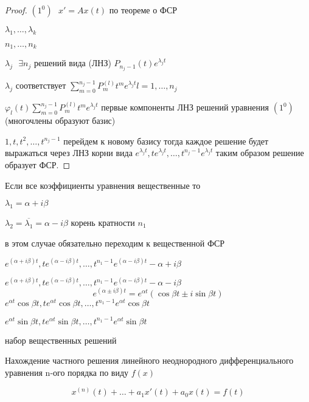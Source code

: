 \begin{proof}
  $(1^0) ~~~ x' = Ax(t)$ по теореме о ФСР

  $\lambda_1, \ldots, \lambda_k$

  $n_1, \ldots, n_k$

  $\lambda_j ~~~ \exists n_j$ решений вида (ЛНЗ) $P_{n_j - 1}(t)e^{\lambda_j t}$

  $\lambda_j$ соответствует $\sum_{m=0}^{n_j - 1} P^{(l)}_m t^m e^{\lambda_j t}
  l = 1, \ldots, n_j$

  $\varphi_l(t)\sum_{m=0}^{n_j - 1} P^{(l)}_m t^m e^{\lambda_j t}$ первые
  компоненты ЛНЗ решений уравнения $(1^0)$ (многочлены образуют базис)

  $1, t, t^2, \ldots, t^{n_j - 1}$ перейдем к новому базису тогда каждое решение
  будет выражаться через ЛНЗ корни вида $e^{\lambda_j t}, te^{\lambda_j t},
  \ldots, t^{n_j - 1} e^{\lambda_j t}$ таким образом решение образует ФСР.
\end{proof}

\begin{block}[Замечание]
  Если все коэффициенты уравнения вещественные то

  $\lambda_1 = \alpha+ i\beta$

  $\lambda_2 = \overline{\lambda_1} = \alpha - i\beta$ корень кратности $n_1$

  в этом случае обязательно переходим к вещественной ФСР

  $e^{(\alpha + i\beta)t}, te^{(\alpha - i\beta)t}, \ldots,
  t^{n_1 - 1}e^{(\alpha - i\beta)t} - \alpha + i\beta$

  $e^{(\alpha + i\beta)t}, te^{(\alpha - i\beta)t}, \ldots,
  t^{n_1 - 1}e^{(\alpha - i\beta)t} - \alpha - i\beta$
  $$
  e^{(\alpha \pm i\beta)t} = e^{\alpha t}(\cos \beta t \pm i \sin \beta t)
  $$
  $e^{\alpha t} \cos \beta t, t e^{\alpha t} \cos \beta t, \ldots,
  t^{n_1 - 1} e^{\alpha t} \cos \beta t$

  $e^{\alpha t} \sin \beta t, t e^{\alpha t} \sin \beta t, \ldots,
  t^{n_1 - 1} e^{\alpha t} \sin \beta t$

  набор вещественных решений
\end{block}

\begin{title}[\Large]
  Нахождение частного решения линейного неоднородного дифференциального
  уравнения n-ого порядка по виду $f(x)$
\end{title}

\begin{define}
  $$
  x^{(n)}(t) + \ldots + a_1 x'(t) + a_0 x(t) = f(t)
  $$
\end{define}


